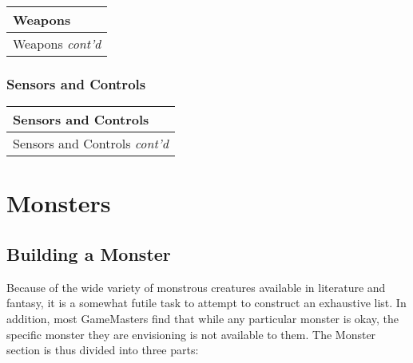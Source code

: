 \documentclass[twoside]{book}
\begin{document}
\begin{longtable}{p{1.25in}} 
  Weapons
  \\
  \hline
  \hline
  \endfirsthead
  Weapons \textit{cont'd}
        
  \\
  \hline
  \endhead
      
\end{longtable}
    
\begin{multicols}{2}
    
\end{multicols}
  
    

\subsection{Sensors and Controls}
    
\begin{longtable}{p{1.25in}} 
  Sensors and Controls
  \\
  \hline
  \hline
  \endfirsthead
  Sensors and Controls \textit{cont'd}
        
  \\
  \hline
  \endhead
      
\end{longtable}
    
\begin{multicols}{2}
    
\end{multicols}
  
    

\chapter{Monsters}
    
    

\section{Building a Monster}
    
    {  
     Because of the wide variety of monstrous creatures
             available in literature and fantasy, it is a somewhat futile
             task to attempt to construct an exhaustive list. In
             addition, most GameMasters find that while any particular
             monster is okay, the specific monster they are envisioning
             is not available to them. The Monster section is thus
             divided into three parts: 
    }
  
\end{document}
